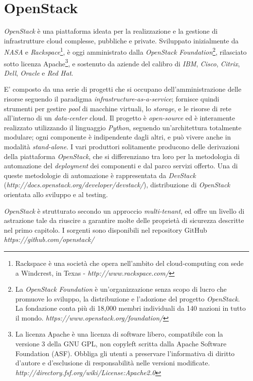 \chapter{OpenStack}
\textit{OpenStack} è una piattaforma ideata per la realizzazione e la gestione di infrastrutture cloud complesse, pubbliche e private.
Sviluppato inizialmente da \textit{NASA} e \textit{Rackspace}\footnote{Rackspace è una società che opera nell'ambito del cloud-computing con sede a Windcrest, in Texas - \textit{http://www.rackspace.com/}}, è oggi amministrato dalla \textit{OpenStack Foundation}\footnote{La \textit{OpenStack Foundation} è un'organizzazione senza scopo di lucro che promuove lo sviluppo, la distribuzione e l'adozione del progetto \textit{OpenStack}. La fondazione conta più di 18,000 membri individuali da 140 nazioni in tutto il mondo.\cite{OpenstackFoundation} \textit{https://www.openstack.org/foundation/} }, rilasciato sotto licenza Apache\footnote{La licenza Apache è una licenza di software libero, compatibile con la versione 3 della GNU GPL, non copyleft scritta dalla Apache Software Foundation (ASF). Obbliga gli utenti a preservare l'informativa di diritto d'autore e d'esclusione di responsabilità nelle versioni modificate. \textit{http://directory.fsf.org/wiki/License:Apache2.0}}, e sostenuto da aziende del calibro di \textit{IBM}, \textit{Cisco}, \textit{Citrix}, \textit{Dell}, \textit{Oracle} e \textit{Red Hat}.\cite{OpenstackWhatIs}

E' composto da una serie di progetti che si occupano dell'amministrazione delle risorse seguendo il paradigma \textit{infrastructure-as-a-service}; fornisce quindi strumenti per gestire \textit{pool} di macchine virtuali, lo \textit{storage}, e le risorse di rete all'interno di un \textit{data-center} cloud.
Il progetto è \textit{open-source} ed è interamente realizzato utilizzando il linguaggio \textit{Python}, seguendo un'architettura totalmente modulare; ogni componente è indipendente dagli altri, e può vivere anche in modalità \textit{stand-alone}.
I vari produttori solitamente producono delle derivazioni della piattaforma \textit{OpenStack}, che si differenziano tra loro per la metodologia di automazione del \textit{deployment} dei componenti e dal parco servizi offerto. Una di queste metodologie di automazione è rappresentata da \textit{DevStack} (\textit{http://docs.openstack.org/developer/devstack/}), distribuzione di \textit{OpenStack} orientata allo sviluppo e al testing.

\textit{OpenStack} è strutturato secondo un approccio \textit{multi-tenant}, ed offre un livello di astrazione tale da riuscire a garantire molte delle proprietà di sicurezza descritte nel primo capitolo.
I sorgenti sono disponibili nel repository GitHub \textit{https://github.com/openstack/}
